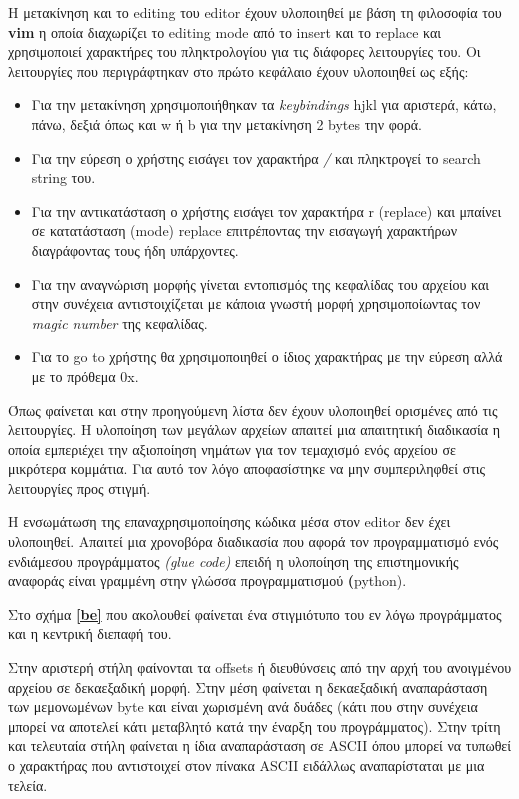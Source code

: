 \pagebreak
Η μετακίνηση και το editing του editor έχουν υλοποιηθεί με βάση τη φιλοσοφία του \textbf{vim} η οποία διαχωρίζει το editing mode από το insert και το replace και χρησιμοποιεί χαρακτήρες του πληκτρολογίου για τις διάφορες λειτουργίες του.
Οι λειτουργίες που περιγράφτηκαν στο πρώτο κεφάλαιο έχουν υλοποιηθεί ως εξής:

\begin{itemize}
	\item Για την μετακίνηση χρησιμοποιήθηκαν τα \emph{keybindings} hjkl για αριστερά, κάτω, πάνω, δεξιά όπως και w ή b για την μετακίνηση 2 bytes την φορά.
	\item Για την εύρεση ο χρήστης εισάγει τον χαρακτήρα \emph{/} και πληκτρογεί το search string του.
	\item Για την αντικατάσταση ο χρήστης εισάγει τον χαρακτήρα r (replace) και μπαίνει σε κατατάσταση (mode) replace επιτρέποντας την εισαγωγή χαρακτήρων διαγράφοντας τους ήδη υπάρχοντες.
	\item Για την αναγνώριση μορφής γίνεται εντοπισμός της κεφαλίδας του αρχείου και στην συνέχεια αντιστοιχίζεται με κάποια γνωστή μορφή χρησιμοποίωντας τον \emph{magic number} της κεφαλίδας.
	\item Για το go to χρήστης θα χρησιμοποιηθεί ο ίδιος χαρακτήρας με την εύρεση αλλά με το πρόθεμα 0x.
\end{itemize}

Όπως φαίνεται και στην προηγούμενη λίστα δεν έχουν υλοποιηθεί ορισμένες από τις λειτουργίες.
Η υλοποίηση των μεγάλων αρχείων απαιτεί μια απαιτητική διαδικασία η οποία εμπεριέχει την αξιοποίηση νημάτων για τον τεμαχισμό ενός αρχείου σε μικρότερα κομμάτια.
Για αυτό τον λόγο αποφασίστηκε να μην συμπεριληφθεί στις λειτουργίες προς στιγμή.

H ενσωμάτωση της επαναχρησιμοποίησης κώδικα μέσα στον editor δεν έχει υλοποιηθεί.
Απαιτεί μια χρονοβόρα διαδικασία που αφορά τον προγραμματισμό ενός ενδιάμεσου προγράμματος \emph{(glue code)} επειδή η υλοποίηση της επιστημονικής αναφοράς είναι γραμμένη στην γλώσσα προγραμματισμού \textbf(python).

\pagebreak
Στο σχήμα \textbf{\ref{be}} που ακολουθεί φαίνεται ένα στιγμιότυπο του εν λόγω προγράμματος και η κεντρική διεπαφή του.

Στην αριστερή στήλη φαίνονται τα offsets ή διευθύνσεις από την αρχή του ανοιγμένου αρχείου σε δεκαεξαδική μορφή.
Στην μέση φαίνεται η δεκαεξαδική αναπαράσταση των μεμονωμένων byte και είναι χωρισμένη ανά δυάδες (κάτι που στην συνέχεια μπορεί να αποτελεί κάτι μεταβλητό κατά την έναρξη του προγράμματος).
Στην τρίτη και τελευταία στήλη φαίνεται η ίδια αναπαράσταση σε ASCII όπου μπορεί να τυπωθεί ο χαρακτήρας που αντιστοιχεί στον πίνακα ASCII ειδάλλως αναπαρίσταται με μια τελεία.

